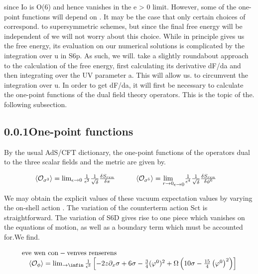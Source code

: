 \documentclass{article}
\begin{document}
\sloppy

since Io is O(6) and hence vanishes in the e > 0 limit. However, some of the one-point
functions will depend on . It may be the case that only certain choices of  correspond.
to supersymmetric schemes, but since the final free energy will be independent of  we will
not worry about this choice. While in principle gives us the free energy, its evaluation on
our numerical solutions is complicated by the integration over u in S6p. As such, we will.
take a slightly roundabout approach to the calculation of the free energy, first calculating
its derivative dF/da and then integrating over the UV parameter a. This will allow us.
to circumvent the integration over u. In order to get dF/da, it will first be necessary to
calculate the one-point functions of the dual field theory operators. This is the topic of the.
following subsection.


\subsection*{0.0.1One-point functions}


By the usual AdS/CFT dictionary, the one-point functions of the operators dual to the three
scalar fields and the metric are given by.


\begin{equation}
\begin{array} { r c l } { \langle \mathcal { O } _ { \sigma ^ { 3 } } \rangle = \operatorname* { l i m } _ { \epsilon \rightarrow 0 } \frac { 1 } { \epsilon ^ { 3 } } \frac { 1 } { \sqrt { \delta } } \frac { \delta S _ { r e n } } { \delta \pi } \qquad \quad \langle \mathcal { O } _ { \sigma ^ { 5 } } \rangle = \underset { r \rightarrow 0 } { \operatorname* { l i m } } _ { \epsilon \rightarrow 0 } \frac { 1 } { \epsilon ^ { 4 } } \frac { 1 } { \sqrt { \delta } } \frac { \delta S _ { r e n } } { \delta \phi ^ { 6 } } } &\end{array}
\end{equation}


We may obtain the explicit values of these vacuum expectation values by varying the on-shell
action . The variation of the counterterm action Sct is straightforward. The variation of S6D
gives rise to one piece which vanishes on the equations of motion, as well as a boundary term
which must be accounted for.We find.


\begin{equation}
\begin{array} { r l r } & { \mathrm { e v e ~ w e n ~ c o n - v e n v e s ~ r e n s e r e n s } } & { } \\ & { \quad \langle \mathcal { O } _ { \phi } \rangle = \operatorname* { l i m } _ { \rightarrow \infin } \frac { 1 } { \epsilon ^ { 3 } } \left [ - 2 z \partial _ { x } \sigma + 6 \sigma - \frac { 3 } { 4 } ( \varphi ^ { 0 } ) ^ { 2 } + \Omega \left ( 1 0 \sigma - \frac { 1 5 } { 4 } \left ( \varphi ^ { 0 } \right ) ^ { 2 } \right ) \right ] } \\ &\end{array}
\end{equation}
\end{document}
